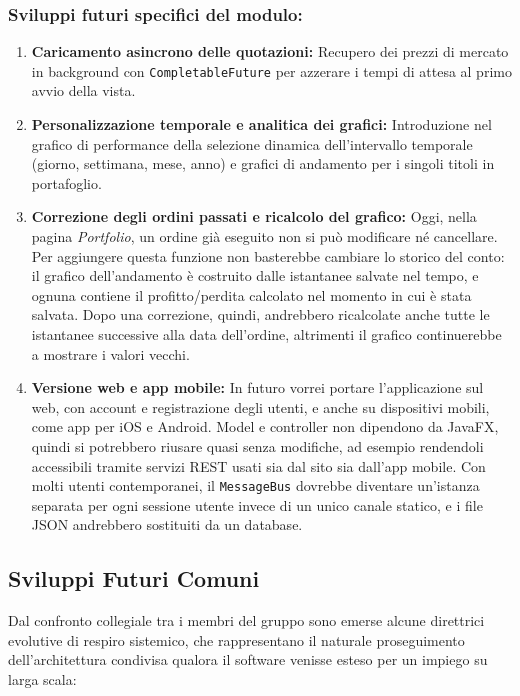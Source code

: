 \documentclass[11pt,a4paper,openright]{report}
\begin{document}
\subsubsection*{Sviluppi futuri specifici del modulo:}
\begin{enumerate}[noitemsep,topsep=2pt]
    \item \textbf{Caricamento asincrono delle quotazioni:} Recupero dei prezzi di mercato in background con \texttt{CompletableFuture} per azzerare i tempi di attesa al primo avvio della vista.
    \item \textbf{Personalizzazione temporale e analitica dei grafici:} Introduzione nel grafico di performance della selezione dinamica dell'intervallo temporale (giorno, settimana, mese, anno) e grafici di andamento per i singoli titoli in portafoglio.
    \item \textbf{Correzione degli ordini passati e ricalcolo del grafico:} Oggi, nella pagina \emph{Portfolio}, un ordine già eseguito non si può modificare né cancellare. Per aggiungere questa funzione non basterebbe cambiare lo storico del conto: il grafico dell'andamento è costruito dalle istantanee salvate nel tempo, e ognuna contiene il profitto/perdita calcolato nel momento in cui è stata salvata. Dopo una correzione, quindi, andrebbero ricalcolate anche tutte le istantanee successive alla data dell'ordine, altrimenti il grafico continuerebbe a mostrare i valori vecchi.
    \item \textbf{Versione web e app mobile:} In futuro vorrei portare l'applicazione sul web, con account e registrazione degli utenti, e anche su dispositivi mobili, come app per iOS e Android. Model e controller non dipendono da JavaFX, quindi si potrebbero riusare quasi senza modifiche, ad esempio rendendoli accessibili tramite servizi REST usati sia dal sito sia dall'app mobile. Con molti utenti contemporanei, il \texttt{MessageBus} dovrebbe diventare un'istanza separata per ogni sessione utente invece di un unico canale statico, e i file JSON andrebbero sostituiti da un database.
\end{enumerate}

\subsection{Sviluppi Futuri Comuni}

Dal confronto collegiale tra i membri del gruppo sono emerse alcune direttrici evolutive di respiro sistemico, che rappresentano il naturale proseguimento dell'architettura condivisa qualora il software venisse esteso per un impiego su larga scala:
\end{document}
